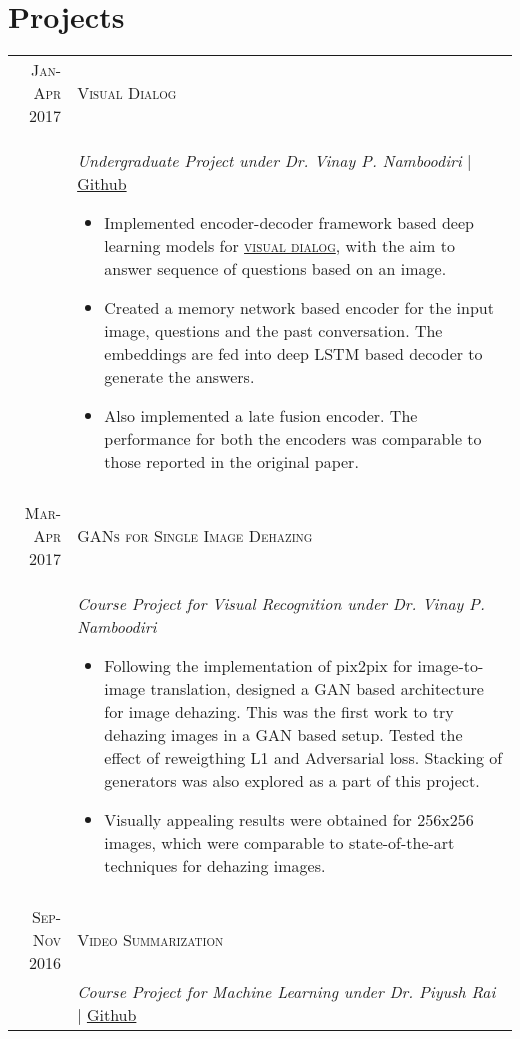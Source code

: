 \documentclass[a4paper,10pt]{article}
\begin{document}
\section{Projects}
\centering
\begin{longtable}{r|p{15cm}}
\textsc{Jan-Apr 2017} & \large \textsc{Visual Dialog}\\
& \textit{Undergraduate Project under Dr. Vinay P. Namboodiri } | \href{https://github.com/architsharma97/VisualDialog}{Github}
\begin{itemize}
\item Implemented encoder-decoder framework based deep learning models for \href{https://visualdialog.org/}{\textsc{visual dialog}}, with the aim to answer sequence of questions based on an image.
\item Created a memory network based encoder for the input image, questions and the past conversation. The embeddings are fed into deep LSTM based decoder to generate the answers.
\item Also implemented a late fusion encoder. The performance for both the encoders was comparable to those reported in the original paper.\vspace*{-\baselineskip}
\end{itemize}\\
\multicolumn{2}{c}{}\\
\textsc{Mar-Apr 2017} & \large \textsc{GANs for Single Image Dehazing}\\
& \textit{Course Project for Visual Recognition under Dr. Vinay P. Namboodiri}
\begin{itemize}
\item Following the implementation of pix2pix for image-to-image translation, designed a GAN based architecture for image dehazing. This was the first work to try dehazing images in a GAN based setup. Tested the effect of reweigthing L1 and Adversarial loss. Stacking of generators was also explored as a part of this project.
\item Visually appealing results were obtained for 256x256 images, which were comparable to state-of-the-art techniques for dehazing images.\vspace*{-\baselineskip}
\end{itemize}\\
\multicolumn{2}{c}{}\\
\textsc{Sep-Nov 2016} & \large \textsc{Video Summarization}\\
& \textit{Course Project for Machine Learning under Dr. Piyush Rai } | \href{http://github.com/architsharma97/VideoSummarization/}{Github}

\end{longtable}
\end{document}
